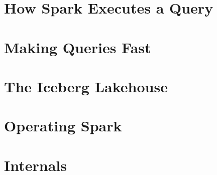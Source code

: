 \documentclass[12pt,oneside]{book}
\theoremstyle{definition}
\renewcommand{\_}{\textunderscore\hspace{0pt}}
\begin{document}
\frontmatter

\setmainfont{Times New Roman}








\listoftables
\newpage
\listoffigures
\newpage

\mainmatter

\part{How Spark Executes a Query}




\part{Making Queries Fast}






\part{The Iceberg Lakehouse}






\part{Operating Spark}




\part{Internals}




\appendix
{}






\backmatter

\end{document}
